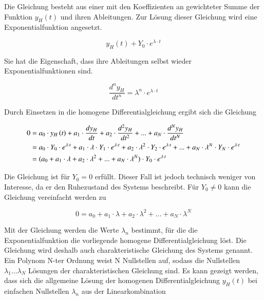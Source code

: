 \noindent Die Gleichung besteht aus einer mit den Koeffizienten an gewichteter Summe der Funktion $y_{H}(t)$ und ihren Ableitungen. Zur Lösung dieser Gleichung wird eine Exponentialfunktion angesetzt.

\begin{equation}\label{eq:sixtyone}
y_{H}(t) + Y_{0}\cdot e^{\lambda \cdot t}
\end{equation}

\noindent Sie hat die Eigenschaft, dass ihre Ableitungen selbst wieder Exponentialfunktionen sind.

\begin{equation}\label{eq:sixtytwo}
\frac{d^n y_{H}}{dt^n}= \lambda ^n \cdot e^{\lambda \cdot t}
\end{equation}

\noindent Durch Einsetzen in die homogene Differentialgleichung ergibt sich die Gleichung

\begin{equation}\label{eq:sixtythree}
\begin{split}
0 & = a_{0} \cdot y_{H} \left(t\right)+a_{1} \cdot \frac{dy_{H} }{dt} +a_{2} \cdot \frac{d^{2} y_{H} }{dt^{2} } +...+a_{N} \cdot \frac{d^{N} y_{H} }{dt^{N} }\\ \medskip
& = a_{0} \cdot Y_{0}\cdot e^{\lambda \cdot t} + a_{1}\cdot\lambda \cdot Y_{1}\cdot e^{\lambda \cdot t} + a_{2}\cdot\lambda ^2 \cdot Y_{2}\cdot e^{\lambda \cdot t} +...+ a_{N}\cdot\lambda ^N \cdot Y_{N}\cdot e^{\lambda \cdot t}\\\medskip
& = (a_{0} + a_{1}\cdot\lambda + a_{2}\cdot\lambda ^2 + ... + a_{N}\cdot\lambda ^N) \cdot Y_{0} \cdot e^{\lambda\cdot t}
\end{split}
\end{equation}

\noindent Die Gleichung ist für $Y_{0} = 0$  erfüllt. Dieser Fall ist jedoch technisch weniger von Interesse, da er den Ruhezustand des Systems beschreibt. Für $Y_{0} \neq 0$ kann die Gleichung vereinfacht werden zu

\begin{equation}\label{eq:sixtyfour}
0 = a_{0}+a_{1}\cdot \lambda + a_{2}\cdot \lambda ^2 +...+a_{N}\cdot \lambda ^N
\end{equation}

\noindent Mit der Gleichung werden die Werte $\lambda _{n}$ bestimmt, für die die Exponentialfunktion die vorliegende homogene Differentialgleichung löst. Die Gleichung wird deshalb auch charakteristische Gleichung des Systems genannt. Ein Polynom N-ter Ordnung weist N Nullstellen auf, sodass die Nullstellen
$\lambda _{1} ... \lambda _{N}$ Lösungen der charakteristischen Gleichung sind. Es kann gezeigt werden, dass sich die allgemeine Lösung der homogenen Differentialgleichung $y_{H}(t)$ bei einfachen Nullstellen $\lambda _{n}$ aus der Linearkombination

